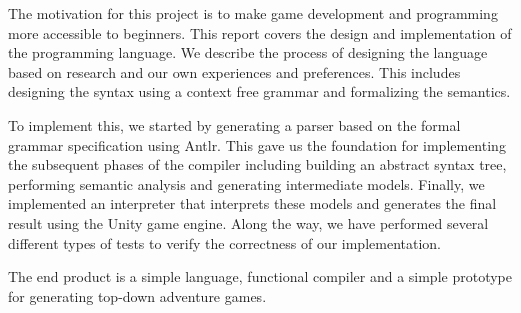 The motivation for this project is to make game development and programming more accessible to beginners.
This report covers the design and implementation of the \dazel{} programming language.
We describe the process of designing the language based on research and our own experiences and preferences.
This includes designing the syntax using a context free grammar and formalizing the semantics.

To implement this, we started by generating a parser based on the formal grammar specification using Antlr.
This gave us the foundation for implementing the subsequent phases of the \dazel{} compiler including building an abstract syntax tree, performing semantic analysis and generating intermediate models. 
Finally, we implemented an interpreter that interprets these models and generates the final result using the Unity game engine.
Along the way, we have performed several different types of tests to verify the correctness of our implementation.

The end product is a simple language, functional compiler and a simple prototype for generating top-down adventure games.